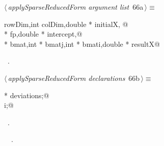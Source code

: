 \documentclass{article}
\begin{document}
\begin{flushleft} \small
\begin{minipage}{\linewidth}\label{scrap99}\raggedright\small
{} $\langle\,${\itshape applySparseReducedForm argument list}\nobreak\ {\footnotesize {66a}}$\,\rangle\equiv$
\vspace{-1ex}
\begin{list}{}{} \item
\mbox{}\verb@int rowDim,int colDim,double * initialX, @\\
\mbox{}\verb@double * fp,double * intercept,@\\
\mbox{}\verb@double * bmat,int * bmatj,int * bmati,double * resultX@\\
\mbox{}\verb@@{\NWsep}
\end{list}
\vspace{-1.5ex}
\footnotesize
\begin{list}{}{\setlength{\itemsep}{-\parsep}\setlength{\itemindent}{-\leftmargin}}
\item \NWtxtMacroRefIn\ .

\item{}
\end{list}
\end{minipage}\vspace{4ex}
\end{flushleft}
\begin{flushleft} \small
\begin{minipage}{\linewidth}\label{scrap100}\raggedright\small
{} $\langle\,${\itshape applySparseReducedForm declarations}\nobreak\ {\footnotesize {66b}}$\,\rangle\equiv$
\vspace{-1ex}
\begin{list}{}{} \item
\mbox{}\verb@double * deviations;@\\
\mbox{}\verb@int i;@{\NWsep}
\end{list}
\vspace{-1.5ex}
\footnotesize
\begin{list}{}{\setlength{\itemsep}{-\parsep}\setlength{\itemindent}{-\leftmargin}}
\item \NWtxtMacroRefIn\ .
\item \NWtxtIdentsUsed\nobreak\  \verb@i@\nobreak\ .
\item{}
\end{list}
\end{minipage}\vspace{4ex}
\end{flushleft}
\end{document}

